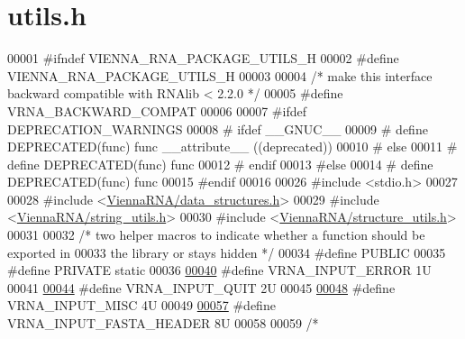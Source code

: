 \hypertarget{utils_8h_source}{}\section{utils.\+h}
\label{utils_8h_source}

\begin{DoxyCode}
00001 \textcolor{preprocessor}{#ifndef VIENNA\_RNA\_PACKAGE\_UTILS\_H}
00002 \textcolor{preprocessor}{#define VIENNA\_RNA\_PACKAGE\_UTILS\_H}
00003 
00004 \textcolor{comment}{/* make this interface backward compatible with RNAlib < 2.2.0 */}
00005 \textcolor{preprocessor}{#define VRNA\_BACKWARD\_COMPAT}
00006 
00007 \textcolor{preprocessor}{#ifdef DEPRECATION\_WARNINGS}
00008 \textcolor{preprocessor}{# ifdef \_\_GNUC\_\_}
00009 \textcolor{preprocessor}{#  define DEPRECATED(func) func \_\_attribute\_\_ ((deprecated))}
00010 \textcolor{preprocessor}{# else}
00011 \textcolor{preprocessor}{#  define DEPRECATED(func) func}
00012 \textcolor{preprocessor}{# endif}
00013 \textcolor{preprocessor}{#else}
00014 \textcolor{preprocessor}{# define DEPRECATED(func) func}
00015 \textcolor{preprocessor}{#endif}
00016 
00026 \textcolor{preprocessor}{#include <stdio.h>}
00027 
00028 \textcolor{preprocessor}{#include <\hyperlink{data__structures_8h}{ViennaRNA/data\_structures.h}>}
00029 \textcolor{preprocessor}{#include <\hyperlink{string__utils_8h}{ViennaRNA/string\_utils.h}>}
00030 \textcolor{preprocessor}{#include <\hyperlink{structure__utils_8h}{ViennaRNA/structure\_utils.h}>}
00031 
00032 \textcolor{comment}{/* two helper macros to indicate whether a function should be exported in}
00033 \textcolor{comment}{the library or stays hidden */}
00034 \textcolor{preprocessor}{#define PUBLIC}
00035 \textcolor{preprocessor}{#define PRIVATE static}
00036 
\hypertarget{utils_8h_source_l00040}{}\hyperlink{group__utils_gad403c9ea58f1836689404c2931419c8c}{00040} \textcolor{preprocessor}{#define VRNA\_INPUT\_ERROR                  1U}
00041 
\hypertarget{utils_8h_source_l00044}{}\hyperlink{group__utils_ga72f3c6ca5c83d2b9baed2922d19c403d}{00044} \textcolor{preprocessor}{#define VRNA\_INPUT\_QUIT                   2U}
00045 
\hypertarget{utils_8h_source_l00048}{}\hyperlink{group__utils_ga8e3241b321c9c1a78a69e59e2e019a71}{00048} \textcolor{preprocessor}{#define VRNA\_INPUT\_MISC                   4U}
00049 
\hypertarget{utils_8h_source_l00057}{}\hyperlink{group__utils_ga2f0d8069e93d3ac54d9320d6bdb8e7e7}{00057} \textcolor{preprocessor}{#define VRNA\_INPUT\_FASTA\_HEADER           8U}
00058 
00059 \textcolor{comment}{/*}

\end{DoxyCode}
